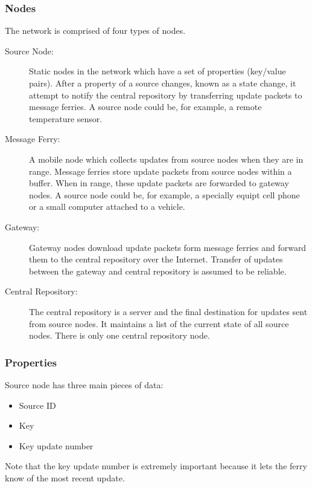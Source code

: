 
\subsubsection{Nodes}

The network is comprised of four types of nodes.

\begin{description}
\item[Source Node: ] 
Static nodes in the network which have a set of properties (key/value pairs).
After a property of a source changes, known as a state change, it attempt to notify the central repository by transferring update packets to message ferries.
A source node could be, for example, a remote temperature sensor.
\item[Message Ferry: ] 
A mobile node which collects updates from source nodes when they are in range.
Message ferries store update packets from source nodes within a buffer. 
When in range, these update packets are forwarded to gateway nodes.
A source node could be, for example, a specially equipt cell phone or a small computer attached to a vehicle. 
\item[Gateway: ]
Gateway nodes download update packets form message ferries and forward them to the central repository over the Internet.
Transfer of updates between the gateway and central repository is assumed to be reliable. 
\item[Central Repository: ] 
The central repository is a server and the final destination for updates sent from source nodes.
It maintains a list of the current state of all source nodes.
There is only one central repository node.
\end{description}


\subsubsection{Properties}

Source node has three main pieces of data:
\begin{itemize}
\item Source ID
\item Key
\item Key update number
\end{itemize}

Note that the key update number is extremely important because it lets the ferry know of the most recent update.


